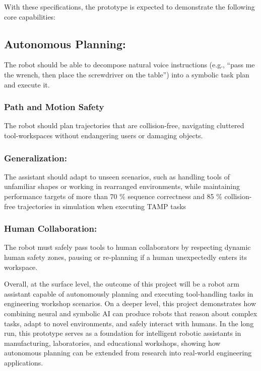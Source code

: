 \documentclass[12pt]{extarticle}
\begin{document}
With these specifications, the prototype is expected to demonstrate the following core capabilities:

\subsection{Autonomous Planning:}

The robot should be able to decompose natural voice instructions (e.g., “pass me the wrench, then place the screwdriver on the table”) into a symbolic task plan and execute it.

\subsubsection{Path and Motion Safety}
The robot should plan trajectories that are collision-free, navigating cluttered tool-workspaces without endangering users or damaging objects.

\subsubsection{Generalization:} The assistant should adapt to unseen scenarios, such as handling tools of unfamiliar shapes or working in rearranged environments, while maintaining performance targets of more than 70 \% sequence correctness and 85 \% collision-free trajectories in simulation when executing TAMP tasks~\cite{tamp}

\subsubsection{Human Collaboration:} The robot must safely pass tools to human collaborators by respecting dynamic human safety zones, pausing or re-planning if a human unexpectedly enters its workspace.

Overall, at the surface level, the outcome of this project will be a robot arm assistant capable of autonomously planning and executing tool-handling tasks in engineering workshop scenarios. On a deeper level, this project demonstrates how combining neural and symbolic AI can produce robots that reason about complex tasks, adapt to novel environments, and safely interact with humans. In the long run, this prototype serves as a foundation for intelligent robotic assistants in manufacturing, laboratories, and educational workshops, showing how autonomous planning can be extended from research into real-world engineering applications.

\newpage
\end{document}
